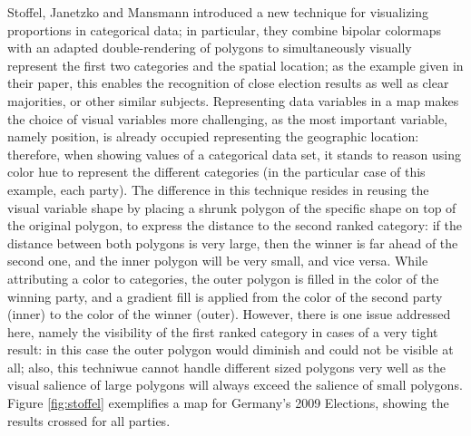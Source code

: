 %
Stoffel, Janetzko and Mansmann introduced a new technique \cite{Stoffel2012} for visualizing proportions in categorical data; in particular, they combine bipolar colormaps
with an adapted double-rendering of polygons to simultaneously visually represent the first two categories and the spatial location; as the example given
in their paper, this enables the recognition of close election results as well as clear majorities, or other similar subjects. Representing data variables
in a map makes the choice of visual variables more challenging, as the most important variable, namely position, is already occupied representing the geographic location:
therefore, when showing values of a categorical data set, it stands to reason using color hue to represent the different categories (in the particular case of this
example, each party). The difference in this technique resides in reusing the visual variable shape by placing a shrunk polygon of the specific shape
on top of the original polygon, to express the distance to the second ranked category: if the distance between both polygons is very large, then the winner is
far ahead of the second one, and the inner polygon will be very small, and vice versa. While attributing a color to categories, the outer polygon is filled in
the color of the winning party, and a gradient fill is applied from the color of the second party (inner) to the color of the winner (outer). However, there is one
issue addressed here, namely the visibility of the first ranked category in cases of a very tight result: in this case the outer polygon would diminish and could
not be visible at all; also, this techniwue cannot handle different sized polygons very well as the visual salience of large polygons will always exceed the
salience of small polygons. Figure \ref{fig:stoffel} exemplifies a map for Germany's 2009 Elections, showing the results crossed for all parties.
%
